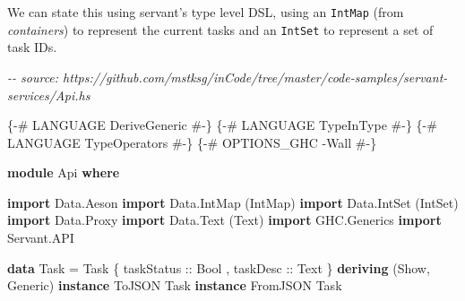 \documentclass[]{article}
\newenvironment{Shaded}{}{}
\newcommand{\CommentTok}[1]{\textcolor[rgb]{0.38,0.63,0.69}{\textit{#1}}}
\newcommand{\DataTypeTok}[1]{\textcolor[rgb]{0.56,0.13,0.00}{#1}}
\newcommand{\KeywordTok}[1]{\textcolor[rgb]{0.00,0.44,0.13}{\textbf{#1}}}
\newcommand{\NormalTok}[1]{#1}
\newcommand{\OtherTok}[1]{\textcolor[rgb]{0.00,0.44,0.13}{#1}}
\begin{document}
We can state this using servant's type level DSL, using an \texttt{IntMap} (from
\emph{containers}) to represent the current tasks and an \texttt{IntSet} to
represent a set of task IDs.

\begin{Shaded}
\begin{Highlighting}[]
\CommentTok{{-}{-} source: https://github.com/mstksg/inCode/tree/master/code{-}samples/servant{-}services/Api.hs}

\OtherTok{\{{-}\# LANGUAGE DeriveGeneric \#{-}\}}
\OtherTok{\{{-}\# LANGUAGE TypeInType    \#{-}\}}
\OtherTok{\{{-}\# LANGUAGE TypeOperators \#{-}\}}
\OtherTok{\{{-}\# OPTIONS\_GHC {-}Wall      \#{-}\}}

\KeywordTok{module} \DataTypeTok{Api} \KeywordTok{where}

\KeywordTok{import}           \DataTypeTok{Data.Aeson}
\KeywordTok{import}           \DataTypeTok{Data.IntMap}\NormalTok{ (}\DataTypeTok{IntMap}\NormalTok{)}
\KeywordTok{import}           \DataTypeTok{Data.IntSet}\NormalTok{ (}\DataTypeTok{IntSet}\NormalTok{)}
\KeywordTok{import}           \DataTypeTok{Data.Proxy}
\KeywordTok{import}           \DataTypeTok{Data.Text}\NormalTok{ (}\DataTypeTok{Text}\NormalTok{)}
\KeywordTok{import}           \DataTypeTok{GHC.Generics}
\KeywordTok{import}           \DataTypeTok{Servant.API}

\KeywordTok{data} \DataTypeTok{Task} \OtherTok{=} \DataTypeTok{Task}
\NormalTok{    \{}\OtherTok{ taskStatus ::} \DataTypeTok{Bool}
\NormalTok{    ,}\OtherTok{ taskDesc   ::} \DataTypeTok{Text}
\NormalTok{    \}}
  \KeywordTok{deriving}\NormalTok{ (}\DataTypeTok{Show}\NormalTok{, }\DataTypeTok{Generic}\NormalTok{)}
\KeywordTok{instance} \DataTypeTok{ToJSON}   \DataTypeTok{Task}
\KeywordTok{instance} \DataTypeTok{FromJSON} \DataTypeTok{Task}


\end{Highlighting}
\end{Shaded}
\end{document}
